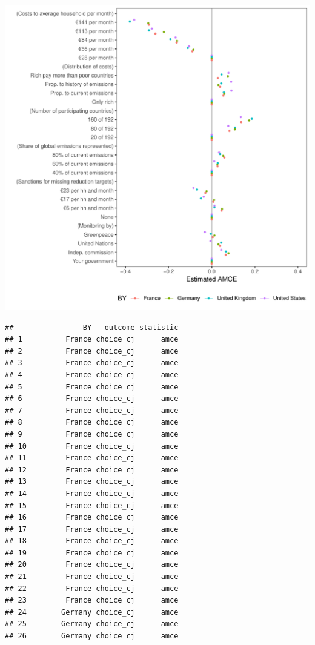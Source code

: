 \documentclass[a4paper,12pt]{article}\usepackage[]{graphicx}\usepackage[]{color}
\makeatletter
\def\maxwidth{ %
  \ifdim\Gin@nat@width>\linewidth
    \linewidth
  \else
    \Gin@nat@width
  \fi
}
\newenvironment{kframe}{%
 \def\at@end@of@kframe{}%
 \ifinner\ifhmode%
  \def\at@end@of@kframe{\end{minipage}}%
  \begin{minipage}{\columnwidth}%
 \fi\fi%
 \def\FrameCommand##1{\hskip\@totalleftmargin \hskip-\fboxsep
 \colorbox{shadecolor}{##1}\hskip-\fboxsep
     \hskip-\linewidth \hskip-\@totalleftmargin \hskip\columnwidth}%
 \MakeFramed {\advance\hsize-\width
   \@totalleftmargin\z@ \linewidth\hsize
   \@setminipage}}%
 {\par\unskip\endMakeFramed%
 \at@end@of@kframe}
\newenvironment{knitrout}{}{} %
\makeatother
\begin{document}
\begin{knitrout}
\color{fgcolor}
\includegraphics[width=\maxwidth]{figure/bechtel_subgroup_amce-1} 
\begin{kframe}\begin{verbatim}
##                BY   outcome statistic
## 1          France choice_cj      amce
## 2          France choice_cj      amce
## 3          France choice_cj      amce
## 4          France choice_cj      amce
## 5          France choice_cj      amce
## 6          France choice_cj      amce
## 7          France choice_cj      amce
## 8          France choice_cj      amce
## 9          France choice_cj      amce
## 10         France choice_cj      amce
## 11         France choice_cj      amce
## 12         France choice_cj      amce
## 13         France choice_cj      amce
## 14         France choice_cj      amce
## 15         France choice_cj      amce
## 16         France choice_cj      amce
## 17         France choice_cj      amce
## 18         France choice_cj      amce
## 19         France choice_cj      amce
## 20         France choice_cj      amce
## 21         France choice_cj      amce
## 22         France choice_cj      amce
## 23         France choice_cj      amce
## 24        Germany choice_cj      amce
## 25        Germany choice_cj      amce
## 26        Germany choice_cj      amce

\end{verbatim}
\end{kframe}
\end{knitrout}
\end{document}
